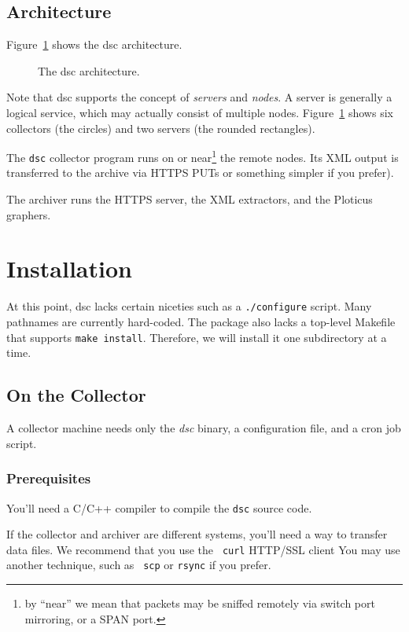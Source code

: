 \documentclass{report}
\def\dsc{{\sc dsc}}
\begin{document}
\section{Architecture}

Figure~\ref{fig-architecture} shows the {\dsc} architecture.  

\begin{figure}
\centerline{}
\caption{\label{fig-architecture}The {\dsc} architecture.}
\end{figure}

Note that {\dsc} supports the concept of {\em servers\/} and {\em
nodes\/}.  A server is generally a logical service, which may
actually consist of multiple nodes.  Figure~\ref{fig-architecture}
shows six collectors (the circles) and two servers (the rounded
rectangles).

The {\tt dsc\/} collector program runs on or near\footnote{by
``near'' we mean that packets may be sniffed remotely via switch
port mirroring, or a SPAN port.} the remote nodes.  Its XML output
is transferred to the archive via HTTPS PUTs or something simpler
if you prefer).

The archiver runs the HTTPS server, the XML extractors, and the
Ploticus graphers.


\chapter{Installation}

At this point, {\dsc} lacks certain niceties such as a {\tt ./configure\/}
script. Many pathnames are currently hard-coded.  The package
also lacks a top-level Makefile that supports {\tt make install\/}.
Therefore, we will install it one subdirectory at a time.

\section{On the Collector}

A collector machine needs only the {\em dsc\/} binary, a configuration file,
and a cron job script.

\subsection{Prerequisites}

You'll need a C/C++ compiler to compile the {\tt dsc\/} source code.

If the collector and archiver are different systems, you'll need a
way to transfer data files.  We recommend that you use the {\tt
curl\/} HTTP/SSL client You may use another technique, such as {\tt
scp\/} or {\tt rsync\/} if you prefer.
\end{document}
